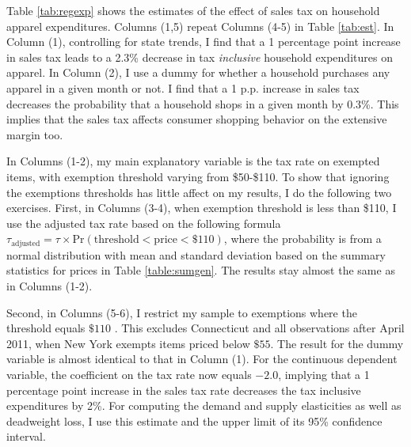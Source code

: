 \documentclass[12pt]{article}
\begin{document}
	Table \ref{tab:regexp} shows the estimates of the effect of sales tax on household apparel expenditures. Columns (1,5) repeat Columns (4-5) in Table \ref{tab:est}. In Column (1), controlling for state trends, I find that a 1 percentage point increase in sales tax leads to a 2.3\% decrease in tax \emph{inclusive} household expenditures on apparel.
	In Column (2), I use a dummy for whether a household purchases any apparel in a given month or not. I find that a 1 p.p. increase in sales tax decreases the probability that a household shops in a given month by 0.3\%. This implies that the sales tax affects consumer shopping behavior on the extensive margin too.
	
	In Columns (1-2), my main explanatory variable is the tax rate on exempted items, with exemption threshold varying from \$50-\$110. To show that ignoring the exemptions thresholds has little affect on my results, I do the following two exercises. First, in Columns (3-4), when exemption threshold is less than \$110, I use the adjusted tax rate based on the following formula $\tau_\text{adjusted}=\tau\times\text{Pr}(\text{threshold}<\text{price}<\$110)$, where the probability is from a normal distribution with mean and standard deviation based on the summary statistics for prices in Table \ref{table:sumgen}. The results stay almost the same as in Columns (1-2).
	
	Second, in Columns (5-6), I restrict my sample to exemptions where the threshold equals $\$110$ . This excludes Connecticut and all observations after April 2011, when New York exempts items priced below $\$55$. The result for the dummy variable is almost identical to that in Column (1).
	For the continuous dependent variable, the coefficient on the tax rate now equals $-2.0$, implying that a 1 percentage point increase in the sales tax rate decreases the tax inclusive expenditures by 2\%. For computing the demand  and supply elasticities as well as deadweight loss, I use this estimate and the upper limit of its 95\% confidence interval.
	
	
	
	
	
\end{document}
